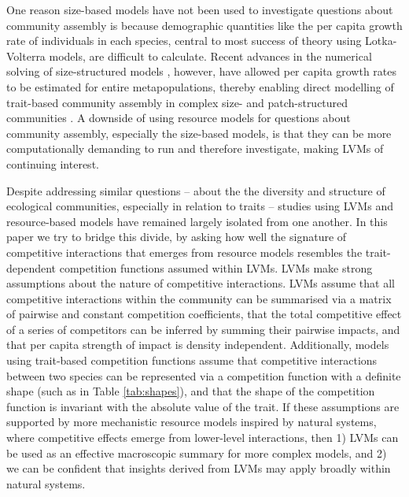 \documentclass[a4paper,11pt]{article}
\begin{document}
One reason size-based models have not been used to investigate questions about community assembly is because demographic quantities like the per capita growth rate of individuals in each species, central to most success of theory using Lotka-Volterra models, are difficult to calculate. Recent advances in the numerical solving of size-structured models \citep{Falster-2016}, however, have allowed per capita growth rates to be estimated for entire metapopulations, thereby enabling direct modelling of trait-based community assembly in complex size- and patch-structured communities \cite{Falster-2017}. A downside of using resource models for questions about community assembly, especially the size-based models, is that they can be more computationally demanding to run and therefore investigate, making LVMs of continuing interest.

Despite addressing similar questions -- about the the diversity and structure of ecological communities, especially in relation to traits -- studies using LVMs and resource-based models have remained largely isolated from one another. In this paper we try to bridge this divide, by asking how well the signature of competitive interactions that emerges from resource models resembles the trait-dependent competition functions assumed within LVMs. LVMs make strong assumptions about the nature of competitive interactions. LVMs assume that all competitive interactions within the community can be summarised via a matrix of pairwise and constant competition coefficients, that the total competitive effect of a series of competitors can be inferred by summing their pairwise impacts, and that per capita strength of impact is density independent. Additionally, models using trait-based competition functions assume that competitive interactions between two species can be represented via a competition function with a definite shape (such as in Table \ref{tab:shapes}), and that the shape of the competition function is invariant with the absolute value of the trait. If these assumptions are supported by more mechanistic resource models inspired by natural systems, where competitive effects emerge from lower-level interactions, then 1) LVMs can be used as an effective macroscopic summary for more complex models, and 2) we can be confident that insights derived from LVMs may apply broadly within natural systems.
\end{document}
